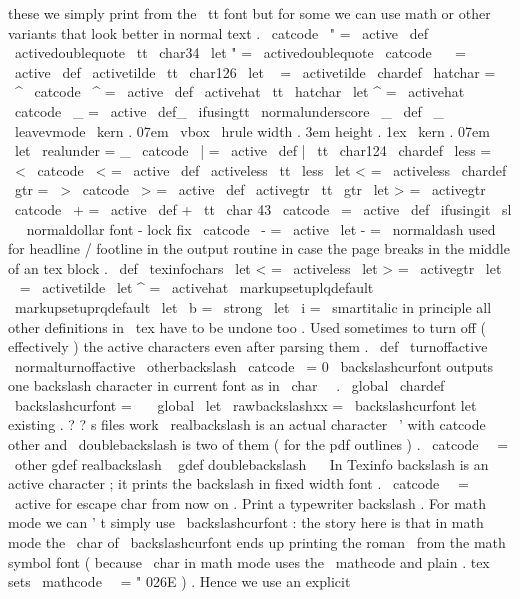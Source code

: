 {{{{these
we
simply
print
from
the
\
tt
font
but
for
some
we
can
%
use
math
or
other
variants
that
look
better
in
normal
text
.
%
\
catcode
\
"
=
\
active
\
def
\
activedoublequote
{
{
\
tt
\
char34
}
}
\
let
"
=
\
activedoublequote
\
catcode
\
~
=
\
active
\
def
\
activetilde
{
{
\
tt
\
char126
}
}
\
let
~
=
\
activetilde
\
chardef
\
hatchar
=
\
^
\
catcode
\
^
=
\
active
\
def
\
activehat
{
{
\
tt
\
hatchar
}
}
\
let
^
=
\
activehat
\
catcode
\
_
=
\
active
\
def_
{
\
ifusingtt
\
normalunderscore
\
_
}
\
def
\
_
{
\
leavevmode
\
kern
.
07em
\
vbox
{
\
hrule
width
.
3em
height
.
1ex
}
\
kern
.
07em
}
\
let
\
realunder
=
_
\
catcode
\
|
=
\
active
\
def
|
{
{
\
tt
\
char124
}
}
\
chardef
\
less
=
\
<
\
catcode
\
<
=
\
active
\
def
\
activeless
{
{
\
tt
\
less
}
}
\
let
<
=
\
activeless
\
chardef
\
gtr
=
\
>
\
catcode
\
>
=
\
active
\
def
\
activegtr
{
{
\
tt
\
gtr
}
}
\
let
>
=
\
activegtr
\
catcode
\
+
=
\
active
\
def
+
{
{
\
tt
\
char
43
}
}
\
catcode
\
=
\
active
\
def
{
\
ifusingit
{
{
\
sl
\
}
}
\
normaldollar
}
%
font
-
lock
fix
\
catcode
\
-
=
\
active
\
let
-
=
\
normaldash
%
used
for
headline
/
footline
in
the
output
routine
in
case
the
page
%
breaks
in
the
middle
of
an
tex
block
.
\
def
\
texinfochars
{
%
\
let
<
=
\
activeless
\
let
>
=
\
activegtr
\
let
~
=
\
activetilde
\
let
^
=
\
activehat
\
markupsetuplqdefault
\
markupsetuprqdefault
\
let
\
b
=
\
strong
\
let
\
i
=
\
smartitalic
%
in
principle
all
other
definitions
in
\
tex
have
to
be
undone
too
.
}
%
Used
sometimes
to
turn
off
(
effectively
)
the
active
characters
even
after
%
parsing
them
.
\
def
\
turnoffactive
{
%
\
normalturnoffactive
\
otherbackslash
}
\
catcode
\
=
0
%
\
backslashcurfont
outputs
one
backslash
character
in
current
font
%
as
in
\
char
\
\
.
\
global
\
chardef
\
backslashcurfont
=
\
\
\
global
\
let
\
rawbackslashxx
=
\
backslashcurfont
%
let
existing
.
?
?
s
files
work
%
\
realbackslash
is
an
actual
character
\
'
with
catcode
other
and
%
\
doublebackslash
is
two
of
them
(
for
the
pdf
outlines
)
.
{
\
catcode
\
\
=
\
other
gdef
realbackslash
{
\
}
gdef
doublebackslash
{
\
\
}
}
%
In
Texinfo
backslash
is
an
active
character
;
it
prints
the
backslash
%
in
fixed
width
font
.
\
catcode
\
\
=
\
active
%
for
escape
char
from
now
on
.
%
Print
a
typewriter
backslash
.
For
math
mode
we
can
'
t
simply
use
%
\
backslashcurfont
:
the
story
here
is
that
in
math
mode
the
\
char
%
of
\
backslashcurfont
ends
up
printing
the
roman
\
from
the
math
symbol
%
font
(
because
\
char
in
math
mode
uses
the
\
mathcode
and
plain
.
tex
%
sets
\
mathcode
\
\
=
"
026E
)
.
Hence
we
use
an
explicit
\
}}}}
